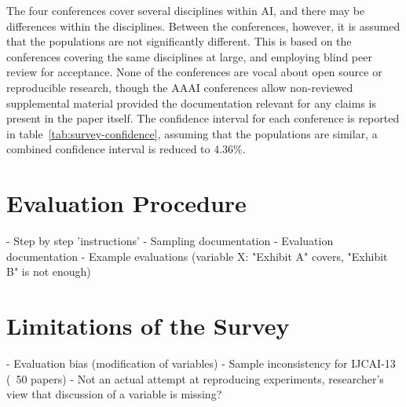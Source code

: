 The four conferences cover several disciplines within AI, and there may be differences within the disciplines. Between the conferences, however, it is assumed that the populations are not significantly different. This is based on the conferences covering the same disciplines at large, and employing blind peer review for acceptance. None of the conferences are vocal about open source or reproducible research, though the AAAI conferences allow non-reviewed supplemental material provided the documentation relevant for any claims is present in the paper itself. The confidence interval for each conference is reported in table~\ref{tab:survey-confidence}, assuming that the populations are similar, a combined confidence interval is reduced to 4.36\%.

\section{Evaluation Procedure}
\label{sec:evaluation-procedure}
- Step by step 'instructions'
- Sampling documentation
- Evaluation documentation
- Example evaluations (variable X: "Exhibit A" covers, "Exhibit B" is not enough)

\section{Limitations of the Survey}
- Evaluation bias (modification of variables)
- Sample inconsistency for IJCAI-13 (~50 papers)
- Not an actual attempt at reproducing experiments, researcher's view that discussion of a variable is missing?

\cleardoublepage
